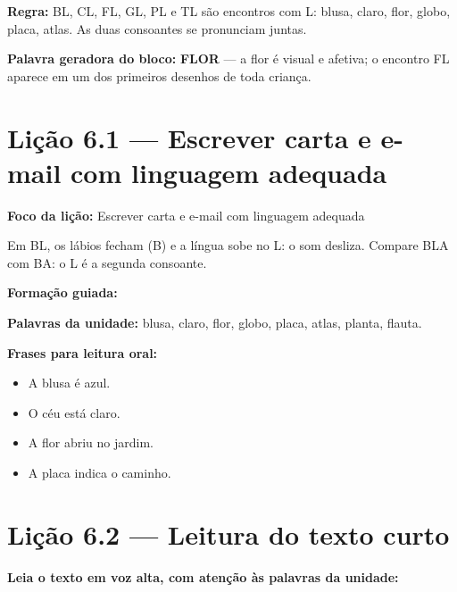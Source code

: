 \textbf{Regra:} BL, CL, FL, GL, PL e TL são encontros com L: blusa, claro, flor, globo, placa, atlas. As duas consoantes se pronunciam juntas.

\textbf{Palavra geradora do bloco:} \textbf{FLOR} --- a flor é visual e afetiva; o encontro FL aparece em um dos primeiros desenhos de toda criança.

\section{Lição 6.1 --- Escrever carta e e-mail com linguagem adequada}

\textbf{Foco da lição:} Escrever carta e e-mail com linguagem adequada


\begin{boquinha}
Em BL, os lábios fecham (B) e a língua sobe no L: o som desliza. Compare BLA com BA: o L é a segunda consoante.
\end{boquinha}

\noindent\textbf{Formação guiada:}

\begin{center}
\end{center}

\noindent\textbf{Palavras da unidade:} blusa, claro, flor, globo, placa, atlas, planta, flauta.

\noindent\textbf{Frases para leitura oral:}
\begin{itemize}[leftmargin=1.6em]
  \item A blusa é azul.
  \item O céu está claro.
  \item A flor abriu no jardim.
  \item A placa indica o caminho.
\end{itemize}

\section{Lição 6.2 --- Leitura do texto curto}

\noindent\textbf{Leia o texto em voz alta, com atenção às palavras da unidade:}



